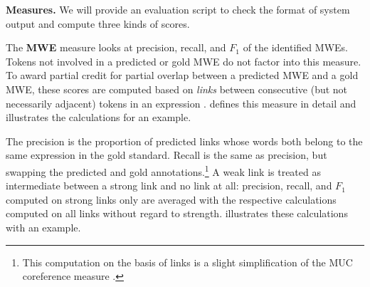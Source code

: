 \documentclass[11pt]{article}
\newcommand{\ensuretext}[1]{#1}
\newcommand{\nssmarker}{\ensuretext{\textcolor{magenta}{\ensuremath{^{\textsc{NS}}_{\textsc{S}}}}}}
\newcommand{\dhmarker}{\ensuretext{\textcolor{red}{\ensuremath{^{\textsc{D}}_{\textsc{H}}}}}}
\newcommand{\arkcomment}[3]{\ensuretext{\textcolor{#3}{[#1 #2]}}}
\newcommand{\nss}[1]{\arkcomment{\nssmarker}{#1}{magenta}}
\newcommand{\dirk}[1]{\arkcomment{\dhmarker}{#1}{red}}
\newcommand{\longversion}[1]{#1} %
\begin{document}

\textbf{Measures.}
We will provide an evaluation script to check the format of system output and
compute three kinds of scores.



The \textbf{MWE} measure looks at precision, recall, and $F_1$ 
of the identified MWEs. Tokens not involved in a predicted or gold MWE
do not factor into this measure. 
To award partial credit for partial overlap between a predicted MWE 
and a gold MWE, these scores are computed based on \emph{links} between 
consecutive (but not necessarily adjacent) tokens in an expression \citep{schneider-14}.
 defines this measure in detail and illustrates the calculations for an example.

 The precision is the proportion of predicted links whose words 
 both belong to the same expression in the gold standard. 
 Recall is the same as precision, but swapping the predicted and gold annotations.\longversion{\footnote{This computation on the basis of links 
 is a slight simplification of the MUC coreference measure \citep{vilain-95}.}}
 A weak link is treated as intermediate between a strong link and no link at all: 
 precision, recall, and $F_1$ computed on strong links only are averaged 
 with the respective calculations computed on all links without regard to strength. 
  illustrates these calculations with an example.
\end{document}
